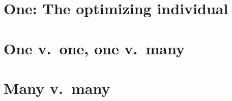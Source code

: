 \documentclass[dvips]{book}
\begin{document}












\mainmatter
\addtocounter{page}{10} %

\part{One: The optimizing individual}
\label{one}


%
\begin{CALCULUS}\end{CALCULUS}







\part{One v.\ one, one v.\ many}
\label{one_v_one}





\begin{CALCULUS}\end{CALCULUS}





\part{Many v.\ many}
\label{many_v_many}





\begin{CALCULUS}\end{CALCULUS}

\end{document}
